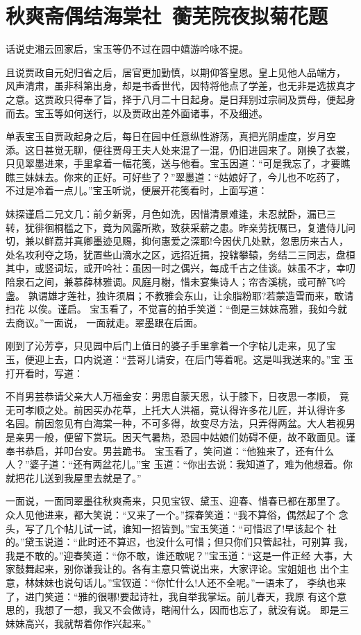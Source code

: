 \chapter{秋爽斋偶结海棠社~蘅芜院夜拟菊花题}

话说史湘云回家后，宝玉等仍不过在园中嬉游吟咏不提。

且说贾政自元妃归省之后，居官更加勤慎，以期仰答皇恩。皇上见他人品端方，
风声清肃，虽非科第出身，却是书香世代，因特将他点了学差，也无非是选拔真才
之意。这贾政只得奉了旨，择于八月二十日起身。是日拜别过宗祠及贾母，便起身
而去。宝玉等如何送行，以及贾政出差外面诸事，不及细述。

单表宝玉自贾政起身之后，每日在园中任意纵性游荡，真把光阴虚度，岁月空
添。这日甚觉无聊，便往贾母王夫人处来混了一混，仍旧进园来了。刚换了衣裳，
只见翠墨进来，手里拿着一幅花笺，送与他看。宝玉因道：“可是我忘了，才要瞧
瞧三妹妹去。你来的正好。可好些了？”翠墨道：“姑娘好了，今儿也不吃药了，
不过是冷着一点儿。”宝玉听说，便展开花笺看时，上面写道：

妹探谨启二兄文几：前夕新霁，月色如洗，因惜清景难逢，未忍就卧，漏已三
转，犹徘徊桐槛之下，竟为风露所欺，致获采薪之患。昨亲劳抚嘱已，复遣侍儿问
切，兼以鲜荔并真卿墨迹见赐，抑何惠爱之深耶!今因伏几处默，忽思历来古人，
处名攻利夺之场，犹置些山滴水之区，远招近揖，投辖攀辕，务结二三同志，盘桓
其中，或竖词坛，或开吟社：虽因一时之偶兴，每成千古之佳谈。妹虽不才，幸叨
陪泉石之间，兼慕薛林雅调。风庭月榭，惜未宴集诗人；帘杏溪桃，或可醉飞吟盏。
孰谓雄才莲社，独许须眉；不教雅会东山，让余脂粉耶?若蒙造雪而来，敢请扫花
以俟。谨启。
宝玉看了，不觉喜的拍手笑道：“倒是三妹妹高雅，我如今就去商议。”一面说，
一面就走。翠墨跟在后面。

刚到了沁芳亭，只见园中后门上值日的婆子手里拿着一个字帖儿走来，见了宝
玉，便迎上去，口内说道：“芸哥儿请安，在后门等着呢。这是叫我送来的。”宝
玉打开看时，写道：

不肖男芸恭请父亲大人万福金安：男思自蒙天恩，认于膝下，日夜思一孝顺，
竟无可孝顺之处。前因买办花草，上托大人洪福，竟认得许多花儿匠，并认得许多
名园。前因忽见有白海棠一种，不可多得，故变尽方法，只弄得两盆。大人若视男
是亲男一般，便留下赏玩。因天气暑热，恐园中姑娘们妨碍不便，故不敢面见。谨
奉书恭启，并叩台安。男芸跪书。
宝玉看了，笑问道：“他独来了，还有什么人？”婆子道：“还有两盆花儿。”宝
玉道：“你出去说：我知道了，难为他想着。你就把花儿送到我屋里去就是了。”

一面说，一面同翠墨往秋爽斋来，只见宝钗、黛玉、迎春、惜春已都在那里了。
众人见他进来，都大笑说：“又来了一个。”探春笑道：“我不算俗，偶然起了个
念头，写了几个帖儿试一试，谁知一招皆到。”宝玉笑道：“可惜迟了!早该起个
社的。”黛玉说道：“此时还不算迟，也没什么可惜；但只你们只管起社，可别算
我，我是不敢的。”迎春笑道：“你不敢，谁还敢呢？”宝玉道：“这是一件正经
大事，大家鼓舞起来，别你谦我让的。各有主意只管说出来，大家评论。宝姐姐也
出个主意，林妹妹也说句话儿。”宝钗道：“你忙什么!人还不全呢。”一语未了，
李纨也来了，进门笑道：“雅的很哪!要起诗社，我自举我掌坛。前儿春天，我原
有这个意思的，我想了一想，我又不会做诗，瞎闹什么，因而也忘了，就没有说。
即是三妹妹高兴，我就帮着你作兴起来。”

